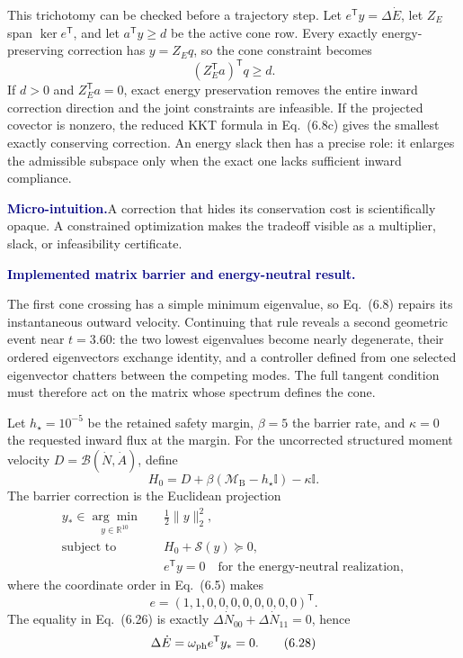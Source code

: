 \documentclass[10pt]{article}
\newcommand{\R}{\mathbb R}
\newcommand{\I}{\mathbb I}
\newcommand{\MB}{\mathcal M_{\mathrm B}}
\newcommand{\LB}{\mathcal B}
\newcommand{\pedbox}[2]{%
  \par\medskip
  \noindent\colorbox{pale}{%
    \parbox{\dimexpr\linewidth-2\fboxsep\relax}{%
      \textcolor{navy}{\textbf{#1}}\quad #2%
    }%
  }\par\medskip
}
\newcommand{\intuition}[1]{\pedbox{Micro-intuition.}{#1}}
\newcommand{\flowlead}[1]{%
  \par\medskip
  \needspace{3\baselineskip}%
  \noindent\textcolor{navy}{\textbf{#1.}}\enspace\ignorespaces
}
\begin{document}
This trichotomy can be checked before a trajectory step.  Let
\(e^{\mathsf T}y=\Delta\dot E\), let \(Z_E\) span
\(\ker e^{\mathsf T}\), and let \(a^{\mathsf T}y\geq d\) be the active
cone row.  Every exactly energy-preserving correction has \(y=Z_Eq\), so the
cone constraint becomes
\[
(Z_E^{\mathsf T}a)^{\mathsf T}q\geq d.
\tag{6.24a}
\]
If \(d>0\) and \(Z_E^{\mathsf T}a=0\), exact energy preservation removes the
entire inward correction direction and the joint constraints are infeasible.
If the projected covector is nonzero, the reduced KKT formula in
Eq.~(6.8c) gives the smallest exactly conserving correction.  An energy slack
then has a precise role: it enlarges the admissible subspace only when the
exact one lacks sufficient inward compliance.

\intuition{A correction that hides its conservation cost is scientifically
opaque.  A constrained optimization makes the tradeoff visible as a
multiplier, slack, or infeasibility certificate.}

\flowlead{Implemented matrix barrier and energy-neutral result}

The first cone crossing has a simple minimum eigenvalue, so Eq.~(6.8) repairs
its instantaneous outward velocity.  Continuing that rule reveals a second
geometric event near \(t=3.60\): the two lowest eigenvalues become nearly
degenerate, their ordered eigenvectors exchange identity, and a controller
defined from one selected eigenvector chatters between the competing modes.
The full tangent condition must therefore act on the matrix whose spectrum
defines the cone.

Let \(h_\star=10^{-5}\) be the retained safety margin,
\(\beta=5\) the barrier rate, and \(\kappa=0\) the requested inward flux at
the margin.  For the uncorrected structured moment velocity
\(D=\LB(\dot N,\dot A)\), define
\[
H_0
=D+\beta\!\left(\MB-h_\star\I\right)-\kappa\I.
\tag{6.25}
\]
The barrier correction is the Euclidean projection
\[
\begin{aligned}
y_\ast\in\underset{y\in\R^{10}}{\arg\min}\quad&
\frac12\lVert y\rVert_2^2,\\
\text{subject to}\quad&
H_0+\mathcal S(y)\succeq0,\\
&e^{\mathsf T}y=0
\quad\text{for the energy-neutral realization},
\end{aligned}
\tag{6.26}
\]
where the coordinate order in Eq.~(6.5) makes
\[
e=(1,1,0,0,0,0,0,0,0,0)^{\mathsf T}.
\tag{6.27}
\]
The equality in Eq.~(6.26) is exactly
\(\Delta\dot N_{00}+\Delta\dot N_{11}=0\), hence
\[
\Delta\dot E
=\omega_{\rm ph}e^{\mathsf T}y_\ast
=0.
\tag{6.28}
\]
\end{document}
